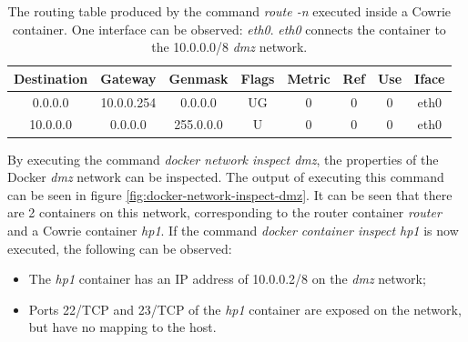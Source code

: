 \begin{table}[!h]
	\begin{center}
		\begin{tabular}{|c|c|c|c|c|c|c|c|} 
			\hline
			\bf Destination  & \bf Gateway  & \bf Genmask  & \bf Flags & \bf Metric & \bf Ref & \bf Use & \bf Iface \\
			\hline
			0.0.0.0 & 10.0.0.254 & 0.0.0.0 & UG & 0 & 0 & 0 & eth0  \\
            10.0.0.0 & 0.0.0.0 & 255.0.0.0 & U & 0 & 0 & 0 & eth0  \\
			\hline
		\end{tabular}
	\end{center}
	\caption[Routing Table of the Cowrie Container]{The routing table produced by the command \textit{route -n} executed inside a Cowrie container. One interface can be observed: \textit{eth0}. \textit{eth0} connects the container to the 10.0.0.0/8 \textit{dmz} network.}	
	\label{table:cowrie-container-routing-table}
\end{table}	
	
By executing the command \textit{docker network inspect dmz}, the properties of the Docker \textit{dmz} network can be inspected. The output of executing this command can be seen in figure \ref{fig:docker-network-inspect-dmz}. It can be seen that there are 2 containers on this network, corresponding to the router container \textit{router} and a Cowrie container \textit{hp1}. If the command \textit{docker container inspect hp1} is now executed, the following can be observed:

\begin{itemize}
\item The \textit{hp1} container has an IP address of 10.0.0.2/8 on the \textit{dmz} network;
\item Ports 22/TCP and 23/TCP of the \textit{hp1} container are exposed on the network, but have no mapping to the host.
\end{itemize}

